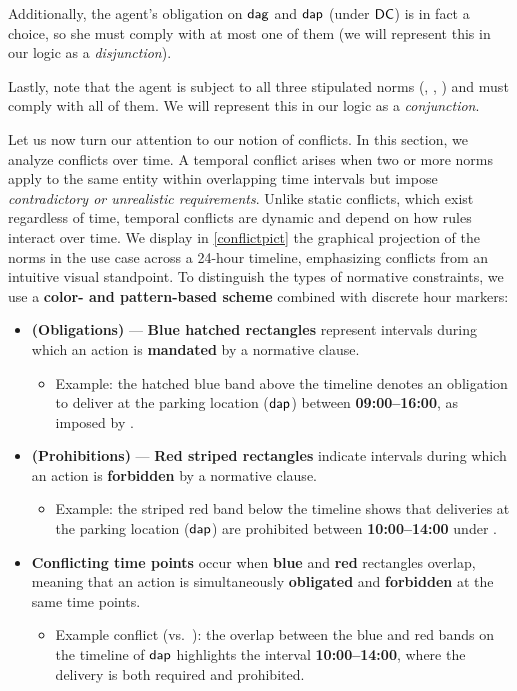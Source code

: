 Additionally, the agent's obligation on $\mathsf{dag}$ and $\mathsf{dap}$ (under $\mathsf{DC}$) is in fact a choice, so she must comply with at most one of them (we will represent this in our logic as a \emph{disjunction}). 

Lastly, note that the agent is subject to all three stipulated norms (\DC, \SR, \MA) and must comply with all of them. We will represent this in our logic as a \emph{conjunction}.

Let us now turn our attention to our notion of conflicts. In this section, we analyze conflicts over time. A temporal conflict arises when two or more norms apply to the same entity within overlapping time intervals but impose \emph{contradictory or unrealistic requirements}. Unlike static conflicts, which exist regardless of time, temporal conflicts are dynamic and depend on how rules interact over time. We display in \ref{conflictpict} the graphical projection of the norms in the use case across a 24-hour timeline, emphasizing conflicts from an intuitive visual standpoint. 
To distinguish the types of normative constraints, we use a \textbf{color- and pattern-based scheme} combined with discrete hour markers:

\begin{itemize}
    \item \textbf{(Obligations)} — \textcolor{blue!80!black}{\textbf{Blue hatched rectangles}} represent intervals during which an action is \textbf{mandated} by a normative clause.  
    \begin{itemize}
        \item Example: the \textcolor{blue!80!black}{hatched blue band} above the timeline denotes an obligation to deliver at the parking location ($\mathsf{dap}$) between \textbf{09{:}00–16{:}00}, as imposed by \DC.
    \end{itemize}

    \item \textbf{(Prohibitions)} — \textcolor{red!80!black}{\textbf{Red striped rectangles}} indicate intervals during which an action is \textbf{forbidden} by a normative clause.  
    \begin{itemize}
        \item Example: the \textcolor{red!80!black}{striped red band} below the timeline shows that deliveries at the parking location ($\mathsf{dap}$) are prohibited between \textbf{10{:}00–14{:}00} under \SR.
    \end{itemize}

    \item \textbf{Conflicting time points} occur when \textbf{blue} and \textbf{red} rectangles overlap, meaning that an action is simultaneously \textbf{obligated} and \textbf{forbidden} at the same time points.  
    \begin{itemize}
        \item Example conflict (\DC vs.~\SR): the overlap between the blue and red bands on the timeline of $\mathsf{dap}$ highlights the interval \textbf{10{:}00–14{:}00}, where the delivery is both required and prohibited.
    \end{itemize}
\end{itemize}
 
